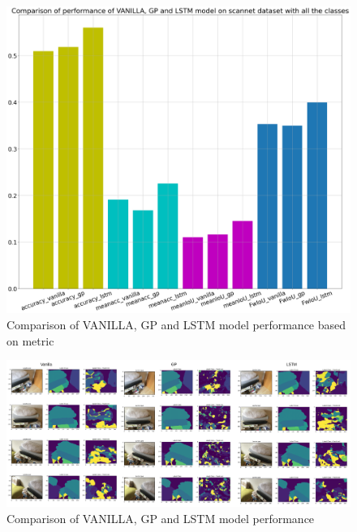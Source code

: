 	\begin{figure}
		\centering
		\includegraphics[width=12cm]{images/scannet_performance_all_classes.png}
		\caption{Comparison of VANILLA, GP and LSTM model performance based on metric}
		\label{fig:unet_model_metric_comparison_all_classes}
	\end{figure}
	
	\begin{figure}
		\centering
		\includegraphics[width=16cm]{images/unet_scannet_all_classes.png}
		\caption{Comparison of VANILLA, GP and LSTM model performance}
		\label{fig:unet_model}
	\end{figure}

	\newpage
		

